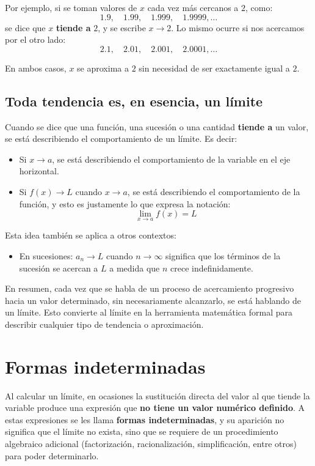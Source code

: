 \documentclass[12pt]{article}
\begin{document}
Por ejemplo, si se toman valores de $x$ cada vez más cercanos a $2$, como:
\[
1.9,\quad 1.99,\quad 1.999,\quad 1.9999,\ldots
\]
se dice que $x$ \textbf{tiende a} $2$, y se escribe $x \to 2$. Lo mismo ocurre si nos acercamos por el otro lado:
\[
2.1,\quad 2.01,\quad 2.001,\quad 2.0001,\ldots
\]

En ambos casos, $x$ se aproxima a $2$ sin necesidad de ser exactamente igual a $2$.

\subsection{Toda tendencia es, en esencia, un límite}

Cuando se dice que una función, una sucesión o una cantidad \textbf{tiende a} un valor, se está describiendo el comportamiento de un límite. Es decir:

\begin{itemize}
    \item Si $x \to a$, se está describiendo el comportamiento de la variable en el eje horizontal.
    \item Si $f(x) \to L$ cuando $x \to a$, se está describiendo el comportamiento de la función, y esto es justamente lo que expresa la notación:
    \[
    \lim_{x \to a} f(x) = L
    \]
\end{itemize}

Esta idea también se aplica a otros contextos:

\begin{itemize}
    \item En sucesiones: $a_n \to L$ cuando $n \to \infty$ significa que los términos de la sucesión se acercan a $L$ a medida que $n$ crece indefinidamente.
\end{itemize}

En resumen, cada vez que se habla de un proceso de acercamiento progresivo hacia un valor determinado, sin necesariamente alcanzarlo, se está hablando de un límite. Esto convierte al límite en la herramienta matemática formal para describir cualquier tipo de tendencia o aproximación.

\section{Formas indeterminadas}

Al calcular un límite, en ocasiones la sustitución directa del valor al que tiende la variable produce una expresión que \textbf{no tiene un valor numérico definido}. A estas expresiones se les llama \textbf{formas indeterminadas}, y su aparición no significa que el límite no exista, sino que se requiere de un procedimiento algebraico adicional (factorización, racionalización, simplificación, entre otros) para poder determinarlo.
\end{document}
